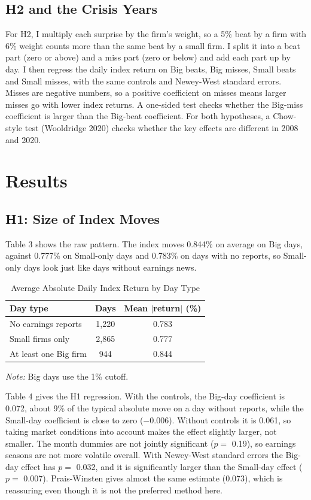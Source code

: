 \documentclass[preprint,letterpaper,11pt,authoryear]{elsarticle}
\newenvironment{tablenotes}{\par\vspace{3pt}\begin{minipage}{0.95\linewidth}\footnotesize\textit{Note:} }{\end{minipage}}
\begin{document}
\subsection{H2 and the Crisis Years}
For H2, I multiply each surprise by the firm's weight, so a 5\% beat by a firm with 6\% weight counts more than the same beat by a small firm. I split it into a beat part (zero or above) and a miss part (zero or below) and add each part up by day. I then regress the daily index return on Big beats, Big misses, Small beats and Small misses, with the same controls and Newey-West standard errors. Misses are negative numbers, so a positive coefficient on misses means larger misses go with lower index returns. A one-sided test checks whether the Big-miss coefficient is larger than the Big-beat coefficient. For both hypotheses, a Chow-style test (Wooldridge 2020) checks whether the key effects are different in 2008 and 2020.

\section{Results}

\subsection{H1: Size of Index Moves}
Table 3 shows the raw pattern. The index moves 0.844\% on average on Big days, against 0.777\% on Small-only days and 0.783\% on days with no reports, so Small-only days look just like days without earnings news.

\begin{table}[!htbp]
\centering\small\setlength{\tabcolsep}{4pt}
\caption{Average Absolute Daily Index Return by Day Type}
\begin{tabular}{lcc}
\toprule
Day type & Days & Mean $|$return$|$ (\%) \\
\midrule
No earnings reports & 1,220 & 0.783 \\
Small firms only & 2,865 & 0.777 \\
At least one Big firm & 944 & 0.844 \\
\bottomrule
\end{tabular}
\begin{tablenotes}
Big days use the 1\% cutoff.
\end{tablenotes}
\end{table}

Table 4 gives the H1 regression. With the controls, the Big-day coefficient is 0.072, about 9\% of the typical absolute move on a day without reports, while the Small-day coefficient is close to zero ($-$0.006). Without controls it is 0.061, so taking market conditions into account makes the effect slightly larger, not smaller. The month dummies are not jointly significant ($p =$ 0.19), so earnings seasons are not more volatile overall. With Newey-West standard errors the Big-day effect has $p =$ 0.032, and it is significantly larger than the Small-day effect ($p =$ 0.007). Prais-Winsten gives almost the same estimate (0.073), which is reassuring even though it is not the preferred method here.
\end{document}
